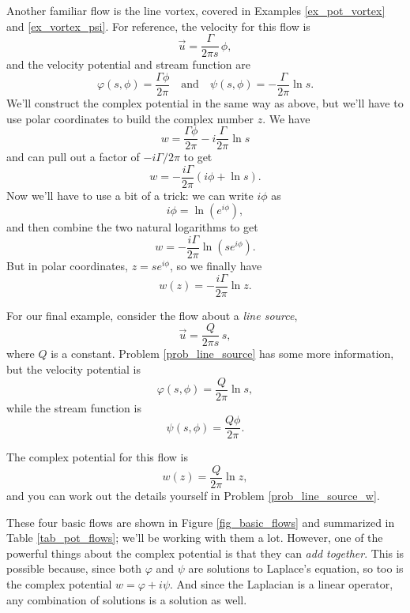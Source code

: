 \begin{example}
\label{ex_line_vortex_w}
Another familiar flow is the line vortex, covered in Examples \ref{ex_pot_vortex} and \ref{ex_vortex_psi}.  For reference, the velocity for this flow is
\[
\vec{u} = \frac{\Gamma}{2\pi s} \, \unit{\phi},
\]
and the velocity potential and stream function are
\[
\varphi(s, \phi) = \frac{\Gamma \phi}{2\pi} \quad \text{and} \quad \psi(s, \phi) = -\frac{\Gamma}{2\pi} \ln s.
\]
We'll construct the complex potential in the same way as above, but we'll have to use polar coordinates to build the complex number $z$.  We have
\[
w = \frac{\Gamma \phi}{2\pi}  -i\frac{\Gamma}{2\pi} \ln s
\]
and can pull out a factor of $-i\Gamma / 2 \pi$ to get
\[
w = -\frac{i\Gamma}{2\pi} \left( i\phi + \ln s \right).
\]
Now we'll have to use a bit of a trick:  we can write $i\phi$ as
\[
i\phi = \ln \left( e^{i\phi} \right),
\]
and then combine the two natural logarithms to get
\[
w = -\frac{i\Gamma}{2\pi} \ln \left( s e^{i\phi} \right).
\]
But in polar coordinates, $z = s e^{i\phi}$, so we finally have
\begin{equation}
w(z) = -\frac{i\Gamma}{2\pi} \ln z.
\end{equation}

\end{example}

\begin{example}
For our final example, consider the flow about a \emph{line source},
\begin{equation}
\vec{u} = \frac{Q}{2\pi s} \, \unit{s},
\end{equation}
where $Q$ is a constant.  Problem \ref{prob_line_source} has some more information, but the velocity potential is
\begin{equation}
\varphi (s, \phi) = \frac{Q}{2\pi} \ln s,
\end{equation}
while the stream function is
\begin{equation}
\psi(s, \phi) = \frac{Q \phi}{2\pi}.
\end{equation}

The complex potential for this flow is
\begin{equation}
w(z) = \frac{Q}{2\pi} \ln z,
\end{equation}
and you can work out the details yourself in Problem \ref{prob_line_source_w}.
\end{example}

These four basic flows are shown in Figure \ref{fig_basic_flows} and summarized in Table \ref{tab_pot_flows}; we'll be working with them a lot.  However, one of the powerful things about the complex potential is that they can \emph{add together}.  This is possible because, since both $\varphi$ and $\psi$ are solutions to Laplace's equation, so too is the complex potential $w = \varphi + i\psi$.  And since the Laplacian is a linear operator, any combination of solutions is a solution as well.

